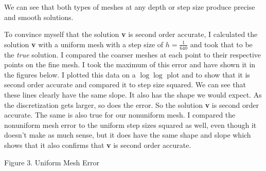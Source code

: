 \documentclass[11pt, oneside]{article}   	%
\begin{document}
\begin{enumerate}
\vspace{2mm}

We can see that both types of meshes at any depth or step size produce precise and smooth solutions. 

To convince myself that the solution \textbf{v} is second order accurate, I calculated the solution \textbf{v} with a uniform mesh with a step size of $h = \frac{1}{640}$ and took that to be the \emph{true} solution. I compared the coarser meshes at each point to their respective points on the fine mesh. I took the maximum of this error and have shown it in the figures below. I plotted this data on a $\log \log$ plot and to show that it is second order accurate and compared it to step size squared. We can see that these lines clearly have the same slope. It also has the shape we would expect. As the discretization gets larger, so does the error. So the solution \textbf{v} is second order accurate. The same is also true for our nonuniform mesh. I compared the nonuniform mesh error to the uniform step sizes squared as well, even though it doesn't make as much sense, but it does have the same shape and slope which shows that it also confirms that \textbf{v} is second order accurate. 

\vspace{2mm}

\centerline {}
\centerline{Figure 3. Uniform Mesh Error}

\vspace{2mm}


\end{enumerate}
\end{document}
